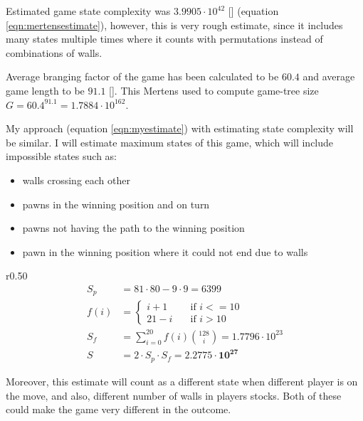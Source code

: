   Estimated game state complexity was $3.9905\cdot10^{42}$
  [\cite{mertens}] (equation \ref{eqn:mertensestimate}), however, this is very rough estimate, since
  it includes many states multiple times where it counts with permutations
  instead of combinations of walls.

  Average branging factor of the game has been calculated to be $60.4$ and
  average game length to be $91.1$ [\cite{glendenning}]. This Mertens used to
  compute game-tree size $G = 60.4^{91.1} = 1.7884{\cdot}10^{162}$.

  My approach (equation \ref{eqn:myestimate}) with estimating state complexity
  will be similar. I will estimate maximum states of this game, which will
  include impossible states such as:
  \begin{itemize}
    \vspace*{-0.25cm}
    \setlength\itemsep{0cm}
    \item walls crossing each other
    \item pawns in the winning position and on turn
    \item pawns not having the path to the winning position
    \item pawn in the winning position where it could not end due to walls
    \vspace*{-0.15cm}
  \end{itemize}
  \begin{wrapfigure}{r}{0.50\textwidth}
    \vspace*{-1.90cm}
    \begin{equation}
      \label{eqn:myestimate}
      \begin{aligned}
        S_p &= 81 {\cdot} 80 - 9 {\cdot} 9 = 6399\\[-0.20cm]
        f(i)\!&=\! \begin{cases}
          i + 1  & \quad \text{if } i <= 10 \\[-0.30cm]
          21 - i & \quad \text{if } i > 10
        \end{cases}\\
        S_f\! &=\! \sum_{i=0}^{20} f(i){128 \choose i} = 1.7796 {\cdot} 10^{23}
        \\
        S &= 2 {\cdot} S_p {\cdot} S_f = \mathbf{2.2775 {\cdot} 10^{27}}
      \end{aligned}
    \end{equation}
    \vspace*{-1.15cm}
  \end{wrapfigure}
  Moreover, this estimate will count as a different state when different
  player is on the move, and also, different number of walls in players
  stocks. Both of these could make the game very different in the outcome.

